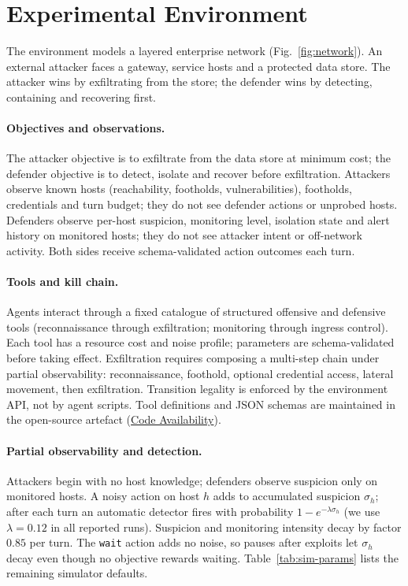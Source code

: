 \section{Experimental Environment}
\label{sec:environment}

The environment models a layered enterprise network
(Fig.~\ref{fig:network}). An external attacker faces a gateway, service
hosts and a protected data store. The attacker wins by exfiltrating from
the store; the defender wins by detecting, containing and recovering first.



\paragraph{Objectives and observations.}
The attacker objective is to exfiltrate from the data store at minimum cost;
the defender objective is to detect, isolate and recover before exfiltration.
Attackers observe known hosts (reachability, footholds, vulnerabilities),
footholds, credentials and turn budget; they do not see defender actions or
unprobed hosts. Defenders observe per-host suspicion, monitoring level,
isolation state and alert history on monitored hosts; they do not see attacker
intent or off-network activity. Both sides receive schema-validated action
outcomes each turn.

\paragraph{Tools and kill chain.}
Agents interact through a fixed catalogue of structured offensive and
defensive tools (reconnaissance through exfiltration; monitoring through
ingress control). Each tool has a resource cost and noise profile; parameters
are schema-validated before taking effect. Exfiltration requires composing a
multi-step chain under partial observability: reconnaissance, foothold,
optional credential access, lateral movement, then exfiltration. Transition
legality is enforced by the environment API, not by agent scripts. Tool
definitions and JSON schemas are maintained in the open-source artefact
(\hyperref[sec:code]{Code Availability}).

\paragraph{Partial observability and detection.}
Attackers begin with no host knowledge; defenders observe suspicion only on
monitored hosts. A noisy action on host $h$ adds to accumulated suspicion
$\sigma_h$; after each turn an automatic detector fires with probability
$1-e^{-\lambda \sigma_h}$ (we use $\lambda=0.12$ in all reported runs).
Suspicion and monitoring intensity decay by factor $0.85$ per turn. The
\texttt{wait} action adds no noise, so pauses after exploits let $\sigma_h$
decay even though no objective rewards waiting. Table~\ref{tab:sim-params}
lists the remaining simulator defaults.

